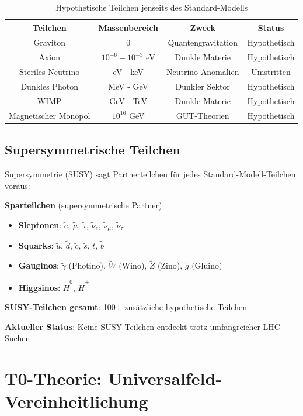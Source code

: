 	\begin{table}[htbp]
		\centering
		\begin{tabular}{|c|c|c|c|}
			\hline
			\textbf{Teilchen} & \textbf{Massenbereich} & \textbf{Zweck} & \textbf{Status} \\
			\hline
			\hline
			Graviton & 0 & Quantengravitation & Hypothetisch \\
			Axion & $10^{-6} - 10^{-3}$ eV & Dunkle Materie & Hypothetisch \\
			Steriles Neutrino & eV - keV & Neutrino-Anomalien & Umstritten \\
			Dunkles Photon & MeV - GeV & Dunkler Sektor & Hypothetisch \\
			WIMP & GeV - TeV & Dunkle Materie & Hypothetisch \\
			Magnetischer Monopol & $10^{16}$ GeV & GUT-Theorien & Hypothetisch \\
			\hline
		\end{tabular}
		\caption{Hypothetische Teilchen jenseits des Standard-Modells}
		\label{tab:hypothetical_particles}
	\end{table}
	
	\subsection{Supersymmetrische Teilchen}
	
	Supersymmetrie (SUSY) sagt Partnerteilchen für jedes Standard-Modell-Teilchen voraus:
	
	\textbf{Sparteilchen} (supersymmetrische Partner):
	\begin{itemize}
		\item \textbf{Sleptonen}: $\tilde{e}$, $\tilde{\mu}$, $\tilde{\tau}$, $\tilde{\nu}_e$, $\tilde{\nu}_\mu$, $\tilde{\nu}_\tau$
		\item \textbf{Squarks}: $\tilde{u}$, $\tilde{d}$, $\tilde{c}$, $\tilde{s}$, $\tilde{t}$, $\tilde{b}$
		\item \textbf{Gauginos}: $\tilde{\gamma}$ (Photino), $\tilde{W}$ (Wino), $\tilde{Z}$ (Zino), $\tilde{g}$ (Gluino)
		\item \textbf{Higgsinos}: $\tilde{H}^0$, $\tilde{H}^{\pm}$
	\end{itemize}
	
	\textbf{SUSY-Teilchen gesamt}: 100+ zusätzliche hypothetische Teilchen
	
	\textbf{Aktueller Status}: Keine SUSY-Teilchen entdeckt trotz umfangreicher LHC-Suchen
	
	\section{T0-Theorie: Universalfeld-Vereinheitlichung}
	
